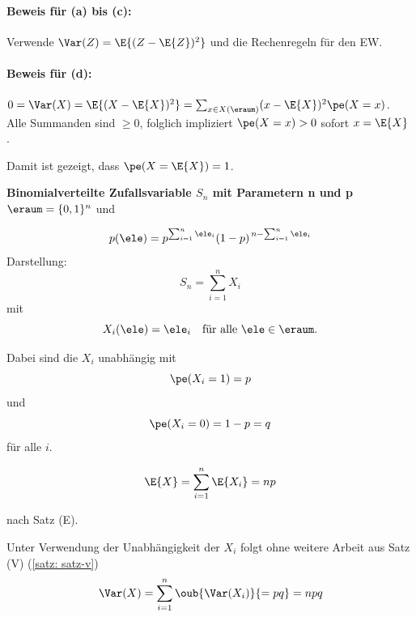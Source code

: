 \begin{satz}
    \paragraph{Beweis für (a) bis (c):} Verwende $\Var(Z ) = \E{(Z- \E{Z})^2}$ und die Rechenregeln für den EW\@.

    \paragraph{Beweis für (d):} $0 = \Var(X) = \E{(X- \E{X})^2} = \sum_{x\in X(\eraum)} (x- \E{X})^2 \pe(X=x)$. \\
    Alle Summanden sind $\geq 0$, folglich impliziert $\pe(X=x) > 0$ sofort $x = \E{X}$
    .

    Damit ist gezeigt, dass $\pe(X=\E{X}) = 1$.

\end{satz}


\begin{bsp}
    \textbf{Binomialverteilte Zufallsvariable $S_n$ mit Parametern n und p}   \\
    $\eraum = \{0,1\}^n$ und

    \[
        p(\ele)
        = p^{\sum_{i=1}^{n} \ele_i}
        (1-p)^{\,n-\sum_{i=1}^{n} \ele_i}
    \]
    Darstellung:
    \[
        S_n = \sum_{i=1}^{n} X_i
    \]
    mit
    \[
        X_i(\ele) = \ele_i
        \quad \text{für alle } \ele \in \eraum.
    \]

    Dabei sind die $X_i$ unabhängig mit
    \[
        \pe(X_i = 1) = p
    \]
    und
    \[
        \pe(X_i = 0) = 1-p = q
    \]
    für alle $i$.

    \[
        \E{X}
        = \sum_{i=1}^{n} \E{X_i}
        = np
    \]

    nach Satz (E). %
\end{bsp}

Unter Verwendung der Unabhängigkeit der $X_i$ folgt ohne weitere Arbeit aus Satz (V) (\ref{satz: satz-v})
\[
    \Var(X) = \sum^n_{i=1} \oub{\Var(X_i)}{=pq} = npq
\]

